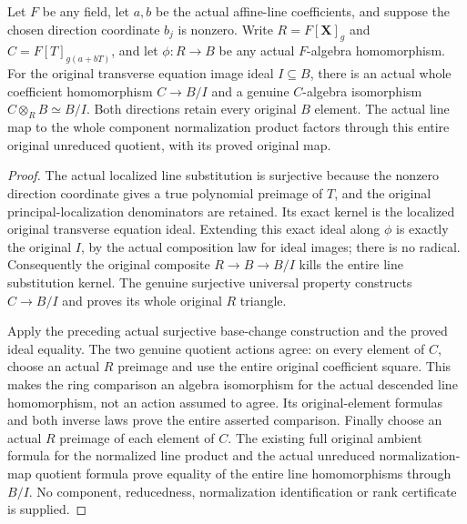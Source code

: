 \begin{theorem}
\label{algebra:line-tensor-original-unreduced-preimage}
\leanok
{}
Let $F$ be any field, let $a,b$ be the actual affine-line coefficients,
and suppose the chosen direction coordinate $b_j$ is nonzero. Write
$R=F[\mathbf X]_g$ and $C=F[T]_{g(a+bT)}$, and let
$\phi:R\to B$ be any actual $F$-algebra homomorphism. For the original
transverse equation image ideal $I\subseteq B$, there is an actual
whole coefficient homomorphism $C\to B/I$ and a genuine
$C$-algebra isomorphism $C\otimes_R B\simeq B/I$.
Both directions retain every original $B$ element. The actual line
map to the whole component normalization product factors through this
entire original unreduced quotient, with its proved original map.
\end{theorem}
\begin{proof}
The actual localized line substitution is surjective because the
nonzero direction coordinate gives a true polynomial preimage of $T$,
and the original principal-localization denominators are retained.
Its exact kernel is the localized original transverse equation ideal.
Extending this exact ideal along $\phi$ is exactly the original $I$,
by the actual composition law for ideal images; there is no radical.
Consequently the original composite $R\to B\to B/I$ kills the entire
line substitution kernel. The genuine surjective universal property
constructs $C\to B/I$ and proves its whole original $R$ triangle.

Apply the preceding actual surjective base-change construction and
the proved ideal equality. The two genuine quotient actions agree:
on every element of $C$, choose an actual $R$ preimage and use the
entire original coefficient square. This makes the ring comparison an
algebra isomorphism for the actual descended line homomorphism, not
an action assumed to agree. Its original-element formulas and both
inverse laws prove the entire asserted comparison. Finally choose an
actual $R$ preimage of each element of $C$. The existing full original
ambient formula for the normalized line product and the actual
unreduced normalization-map quotient formula prove equality of the
entire line homomorphisms through $B/I$. No component, reducedness,
normalization identification or rank certificate is supplied.
\end{proof}

